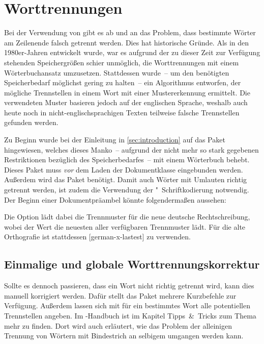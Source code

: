 \documentclass[%
  english,ngerman,%
  cdgeometry=no,DIV=12,automark,%
]{tudscrartcl}
\begin{document}
\section{Worttrennungen}
\label{sec:hyphenation}
Bei der Verwendung von  gibt es ab und an das Problem, dass 
bestimmte Wörter am Zeilenende falsch getrennt werden. Dies hat historische 
Gründe. Als  in den 1980er-Jahren entwickelt wurde, war es aufgrund 
der zu dieser Zeit zur Verfügung stehenden Speichergrößen schier unmöglich, die 
Worttrennungen mit einem Wörterbuchansatz umzusetzen. Stattdessen wurde~-- um 
den benötigten Speicherbedarf möglichst gering zu halten~-- ein Algorithmus 
entworfen, der mögliche Trennstellen in einem Wort mit einer Mustererkennung 
ermittelt. Die verwendeten Muster basieren jedoch auf der englischen Sprache, 
weshalb auch heute noch in nicht-englischsprachigen Texten teilweise falsche 
Trennstellen gefunden werden.

Zu Beginn wurde bei der Einleitung in \autoref{sec:introduction} auf das Paket 
 hingewiesen, welches dieses Manko~-- aufgrund der nicht 
mehr so stark gegebenen Restriktionen bezüglich des Speicherbedarfes~-- mit 
einem Wörterbuch behebt. Dieses Paket muss \emph{vor} dem Laden der 
Dokumentklasse eingebunden werden. Außerdem wird das Paket  
benötigt. Damit auch Wörter mit Umlauten richtig getrennt werden, ist zudem die 
Verwendung der "~Schriftkodierung notwendig. Der Beginn einer 
Dokumentpräambel könnte folgendermaßen aussehen:
%
%
Die Option  lädt dabei die Trennmuster für die neue deutsche 
Rechtschreibung, wobei der Wert  die neuesten aller 
verfügbaren Trennmuster lädt. Für die alte Orthografie ist stattdessen 
[german-x-lastest] zu verwenden.


\subsection{Einmalige und globale Worttrennungskorrektur}
Sollte es dennoch passieren, dass ein Wort nicht richtig getrennt wird, kann 
dies manuell korrigiert werden. Dafür stellt das Paket  mehrere 
Kurzbefehle zur Verfügung. Außerdem lassen sich mit  für ein 
bestimmtes Wort alle potentiellen Trennstellen angeben. Im \TUDScript-Handbuch
ist im Kapitel Tipps~\&~Tricks zum Thema  mehr zu finden. Dort wird auch 
erläutert, wie das Problem der alleinigen Trennung von Wörtern mit Bindestrich 
an selbigem umgangen werden kann.
\end{document}
